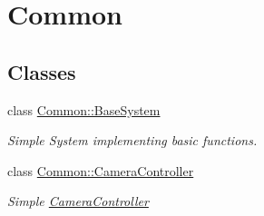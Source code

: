 \hypertarget{group___common}{}\section{Common}
\label{group___common}
\subsection*{Classes}
\begin{DoxyCompactItemize}
\item 
class \hyperlink{class_common_1_1_base_system}{Common\+::\+Base\+System}
\begin{DoxyCompactList}\small\item\em Simple System implementing basic functions. \end{DoxyCompactList}\item 
class \hyperlink{class_common_1_1_camera_controller}{Common\+::\+Camera\+Controller}
\begin{DoxyCompactList}\small\item\em Simple \hyperlink{class_common_1_1_camera_controller}{Camera\+Controller}


\end{DoxyCompactList}
\end{DoxyCompactItemize}
